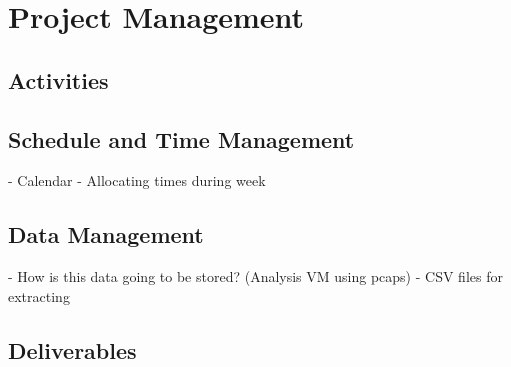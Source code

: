 \documentclass[a4paper,12pt,oneside]{book}			%
\begin{document}
\chapter{Project Management}\label{ch:project management}
\section{Activities}\label{sec:activities}
\section{Schedule and Time Management}\label{sec:time management}
- Calendar
- Allocating times during week
\section{Data Management}\label{sec:data management}
- How is this data going to be stored? (Analysis VM using pcaps)
- CSV files for extracting
\section{Deliverables}\label{sec: deliverables}
\end{document}
